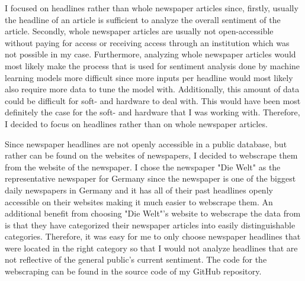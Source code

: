\documentclass[11pt, a4paper, leqno]{article}
\begin{document}
I focused on headlines rather than whole newspaper articles since, firstly, usually the headline of an article is sufficient to analyze the overall sentiment of the article. Secondly, whole newspaper articles are usually not open-accessible without paying for access or receiving access through an institution which was not possible in my case. Furthermore, analyzing whole newspaper articles would most likely make the process that is used for sentiment analysis done by machine learning models more difficult since more inputs per headline would most likely also require more data to tune the model with. Additionally, this amount of data could be difficult for soft- and hardware to deal with. This would have been most definitely the case for the soft- and hardware that I was working with. Therefore, I decided to focus on headlines rather than on whole newspaper articles.

Since newspaper headlines are not openly accessible in a public database, but rather can be found on the websites of newspapers, I decided to webscrape them from the website of the newspaper. I chose the newspaper "Die Welt" as the representative newspaper for Germany since the newspaper is one of the biggest daily newspapers in Germany and it has all of their past headlines openly accessible on their websites making it much easier to webscrape them. An additional benefit from choosing "Die Welt"'s website to webscrape the data from is that they have categorized their newspaper articles into easily distinguishable categories. Therefore, it was easy for me to only choose newspaper headlines that were located in the right category so that I would not analyze headlines that are not reflective of the general public's current sentiment. The code for the webscraping can be found in the source code of my GitHub repository.
\end{document}
